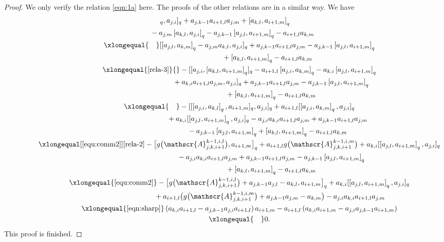 \documentclass[pdftex]{sigma}
\numberwithin{equation}{section}
\def\lr#1{\left[#1\right]}
\def\lrb#1{\left(#1\right)}
\def\A{\mathscr{A}}
\begin{document}
\begin{proof}
We only verify the relation \eqref{eqn:1a} here.
The proofs of the other relations are in a similar way.
We have
\begin{gather*}
 [\lr{a_{j,l},a_{k,m}}_q,a_{j,i}]_q +a_{j,k-1}a_{i+1,l}a_{j,m} +\lr{a_{k,l},a_{i+1,m}}_q \\
 \qquad {}-a_{j,m}\lr{a_{k,l},a_{j,i}}_q-a_{j,k-1}\lr{a_{j,l},a_{i+1,m}}_q-a_{i+1,l}a_{k,m} \\
\qquad\qquad \xlongequal{\quad} [\lr{a_{j,l},a_{k,m}}_q-a_{j,m}a_{k,l},a_{j,i}]_q +a_{j,k-1}a_{i+1,l}a_{j,m} -a_{j,k-1}\lr{a_{j,l},a_{i+1,m}}_q\\
 \phantom{\qquad\qquad\xlongequal{\quad}}{} +\lr{a_{k,l},a_{i+1,m}}_q -a_{i+1,l}a_{k,m} \\
\qquad\qquad \xlongequal{\eqref{rela-3}} {}-[[a_{j,i},\lr{a_{k,l},a_{i+1,m}}_q ]_q -a_{i+1,l}\lr{a_{j,i},a_{k,m} }_q -a_{k,i}\lr{a_{j,l},a_{i+1,m}}_q\\
 \phantom{\qquad\qquad\xlongequal{\qquad}}{}+a_{k,i}a_{i+1,l}a_{j,m},
 a_{j,i}]_q +a_{j,k-1}a_{i+1,l}a_{j,m} -a_{j,k-1}\lr{a_{j,l},a_{i+1,m}}_q\\
 \phantom{\qquad\qquad\xlongequal{\qquad}}{}
 +\lr{a_{k,l},a_{i+1,m}}_q -a_{i+1,l}a_{k,m} \\
\qquad\qquad \xlongequal{\quad} -[[\lr{a_{j,i},a_{k,l}}_q,a_{i+1,m} ]_q,a_{j,i}]_q +a_{i+1,l}[\lr{a_{j,i},a_{k,m}}_q, a_{j,i}]_q \\
 \phantom{\qquad\qquad\xlongequal{\quad}}{}+a_{k,i}[\lr{a_{j,l},a_{i+1,m}}_q, a_{j,i}]_q -a_{j,i}a_{k,i}a_{i+1,l}a_{j,m}+a_{j,k-1}a_{i+1,l}a_{j,m} \\
 \phantom{\qquad\qquad\xlongequal{\quad}}{}-a_{j,k-1}\lr{a_{j,l},a_{i+1,m}}_q+\lr{a_{k,l},a_{i+1,m}}_q -a_{i+1,l}a_{k,m} \\
 \qquad\qquad \xlongequal[\eqref{equ:comm2}]{\eqref{rela-2}} -\bigl[g\bigl(\A_{j,k,i+1}^{k-1,i,l}\bigr),a_{i+1,m}\bigr]_q +a_{i+1,l}g\bigl(\A_{j,k,i+1}^{k-1,i,m}\bigr) +a_{k,i}[\lr{a_{j,l},a_{i+1,m}}_q, a_{j,i}]_q \\
 \phantom{\qquad\qquad\xlongequal{\qquad}}{} -a_{j,i}a_{k,i}a_{i+1,l}a_{j,m} +a_{j,k-1}a_{i+1,l}a_{j,m} -a_{j,k-1}\lr{a_{j,l},a_{i+1,m}}_q\\
 \phantom{\qquad\qquad\xlongequal{\qquad}}{} +\lr{a_{k,l},a_{i+1,m}}_q -a_{i+1,l}a_{k,m} \\
 \qquad\qquad \xlongequal{\eqref{equ:comm2}} -\bigl[g\bigl(\A_{j,k,i+1}^{k-1,i,l}\bigr)+a_{j,k-1}a_{j,l}-a_{k,l},a_{i+1,m}\bigr]_q +a_{k,i}[\lr{a_{j,l},a_{i+1,m}}_q, a_{j,i}]_q \\
 \phantom{\qquad\qquad\xlongequal{\qquad}\!\! }{} +a_{i+1,l}\bigl(g\bigl(\A_{j,k,i+1}^{k-1,i,m}\bigr) +a_{j,k-1}a_{j,m}-a_{k,m}\bigr) -a_{j,i}a_{k,i}a_{i+1,l}a_{j,m} \\
 \qquad\qquad \xlongequal{\eqref{eqn:sharp}} \lrb{a_{k,i}a_{i+1,l} -a_{j,k-1}a_{j,i}a_{i+1,l}}a_{i+1,m} -a_{i+1,l}\lrb{a_{k,i}a_{i+1,m} -a_{j,i}a_{j,k-1}a_{i+1,m}}\\
 \qquad\qquad \xlongequal{\quad} 0.
\end{gather*}
This proof is finished.
\end{proof}
\end{document}
